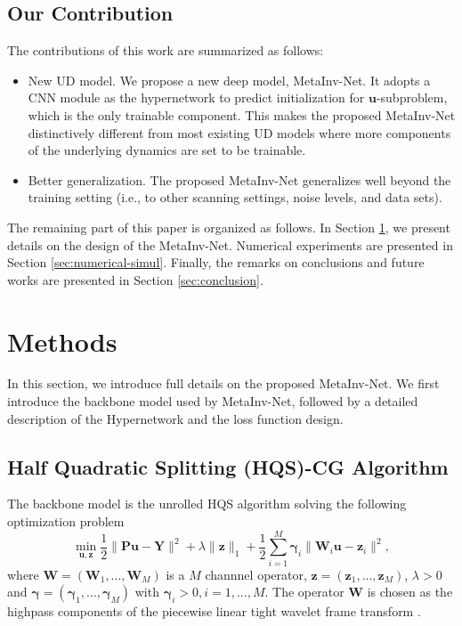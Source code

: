 \documentclass[journal,twoside]{IEEEtran}
\begin{document}
\subsection{Our Contribution}
The contributions of this work are summarized as follows:
\begin{itemize}
  \item New UD model. We propose a new deep model, MetaInv-Net. It adopts a CNN module as the hypernetwork to predict initialization for $\bm{u}$-subproblem, which is the only trainable component. This makes the proposed MetaInv-Net distinctively different from most existing UD models where more components of the underlying dynamics are set to be trainable. 
  \item Better generalization. The proposed MetaInv-Net generalizes well beyond the training setting (i.e., to other scanning settings, noise levels, and data sets).
\end{itemize}

The remaining part of this paper is organized as follows. In Section \ref{sec-methods}, we present details on the design of the MetaInv-Net. Numerical experiments are presented in Section \ref{sec:numerical-simul}. Finally, the remarks on conclusions and future works are presented in Section \ref{sec:conclusion}.


\section{Methods}\label{sec-methods}
In this section, we introduce full details on the proposed MetaInv-Net. We first introduce the backbone model used by MetaInv-Net, followed by a detailed description of the Hypernetwork and the loss function design.

\subsection{Half Quadratic Splitting (HQS)-CG Algorithm}
The backbone model is the unrolled HQS algorithm \cite{geman1995HQS} solving the following optimization problem
\begin{equation}\label{variable-sep-model}
\min_{\bm{u},\bm{z}} \frac{1}{2}\|\bm{P}\bm{u}-\bm{Y}\|^{2}+\lambda\|\bm{z}\|_{1}+\frac{1}{2}\sum_{i=1}^{M} \bm{\gamma}_{i}\|\bm{W}_{i}\bm{u}-\bm{z}_{i}\|^2,
\end{equation}
where $\bm{W}=(\bm{W}_{1},...,\bm{W}_{M})$ is a $M$ channnel operator, $\bm{z}=(\bm{z}_{1},...,\bm{z}_{M})$, $\lambda>0$ and $\bm{\gamma}=(\bm{\gamma}_{1},...,\bm{\gamma}_{M})$ with $\bm{\gamma}_{i}>0, i=1,...,M$. The operator $\bm{W}$ is chosen as the highpass components of the piecewise linear tight wavelet frame transform \cite{ron1997affine,Dong2010IASNotes}.
\end{document}
